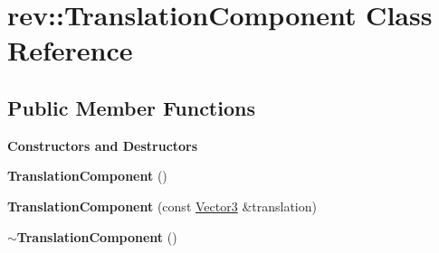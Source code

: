 \hypertarget{classrev_1_1_translation_component}{}\section{rev\+::Translation\+Component Class Reference}
\label{classrev_1_1_translation_component}
\subsection*{Public Member Functions}
\begin{Indent}\textbf{ Constructors and Destructors}\par
\begin{DoxyCompactItemize}
\item 
\mbox{\label{classrev_1_1_translation_component_a22c0a0843909917ffd3d6993751ce729}} 
{\bfseries Translation\+Component} ()
\item 
\mbox{\label{classrev_1_1_translation_component_a9119e9c088ee6678d25e5be0a23ea682}} 
{\bfseries Translation\+Component} (const \mbox{\hyperlink{classrev_1_1_vector}{Vector3}} \&translation)
\item 
\mbox{\label{classrev_1_1_translation_component_af7b45ed4c1dfa36571c76e952d0ee139}} 
{\bfseries $\sim$\+Translation\+Component} ()
\end{DoxyCompactItemize}
\end{Indent}
